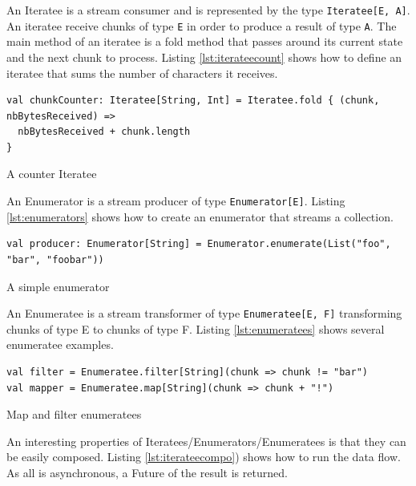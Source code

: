 An Iteratee is a stream consumer and is represented by the type \verb|Iteratee[E, A]|. An iteratee receive chunks of type \verb|E| 
in order to produce a result of type \verb|A|. The main method of an iteratee is a fold method that passes around its current state and the
next chunk to process.
Listing \ref{lst:iterateecount} shows how to define an iteratee that sums the number of characters it receives.

\begin{listing}[h]
\begin{verbatim}
val chunkCounter: Iteratee[String, Int] = Iteratee.fold { (chunk, nbBytesReceived) =>
  nbBytesReceived + chunk.length
}
\end{verbatim}
\caption{A counter Iteratee}
\label{lst:iterateecount}
\end{listing}

An Enumerator is a stream producer of type \verb|Enumerator[E]|. Listing \ref{lst:enumerators} shows how to create an enumerator that streams a collection.

\begin{listing}[h]
\begin{verbatim}
val producer: Enumerator[String] = Enumerator.enumerate(List("foo", "bar", "foobar"))
\end{verbatim}
\caption{A simple enumerator}
\label{lst:enumerators}
\end{listing}

An Enumeratee is a stream transformer of type \verb|Enumeratee[E, F]| transforming chunks of type E to chunks of type F.
Listing \ref{lst:enumeratees} shows several enumeratee examples.

\begin{listing}[h]
\begin{verbatim}
val filter = Enumeratee.filter[String](chunk => chunk != "bar")
val mapper = Enumeratee.map[String](chunk => chunk + "!")
\end{verbatim}
\caption{Map and filter enumeratees}
\label{lst:enumeratees}
\end{listing}

An interesting properties of Iteratees/Enumerators/Enumeratees is that they can be easily composed. Listing \ref{lst:iterateecompo}) shows how to
run the data flow. As all is asynchronous, a Future of the result is returned. 

